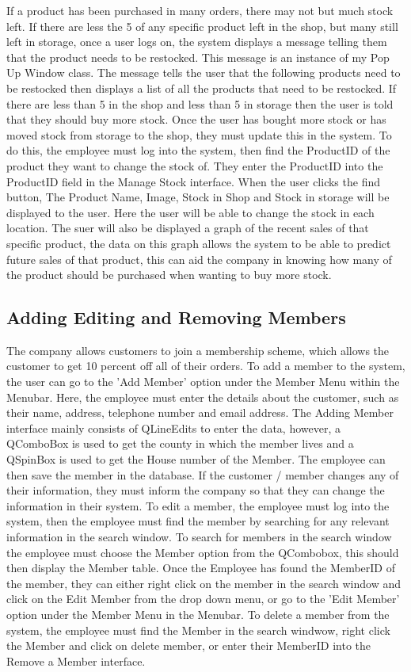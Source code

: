 If a product has been purchased in many orders, there may not but much stock left. If there are less the 5 of any specific product left in the shop, but many still left in storage, once a user logs on, the system displays a message telling them that the product needs to be restocked. This message is an instance of my Pop Up Window class. The message tells the user that the following products need to be restocked then displays a list of all the products that need to be restocked. If there are less than 5 in the shop and less than 5 in storage then the user is told that they should buy more stock. Once the user has bought more stock or has moved stock from storage to the shop, they must update this in the system. To do this, the employee must log into the system, then find the ProductID of the product they want to change the stock of. They enter the ProductID into the ProductID field in the Manage Stock interface. When the user clicks the find button, The Product Name, Image, Stock in Shop and Stock in storage will be displayed to the user. Here the user will be able to change the stock in each location. The suer will also be displayed a graph of the recent sales of that specific product, the data on this graph allows the system to be able to predict future sales of that product, this can aid the company in knowing how many of the product should be purchased when wanting to buy more stock.

\subsection{Adding Editing and Removing Members}
The company allows customers to join a membership scheme, which allows the customer to get 10 percent off all of their orders. To add a member to the system, the user can go to the 'Add Member' option under the Member Menu within the Menubar. Here, the employee must enter the details about the customer, such as their name, address, telephone number and email address. The Adding Member interface mainly consists of QLineEdits to enter the data, however, a QComboBox is used to get the county in which the member lives and a QSpinBox is used to get the House number of the Member. The employee can then save the member in the database. If the customer / member changes any of their information, they must inform the company so that they can change the information in their system. To edit a member, the employee must log into the system, then the employee must find the member by searching for any relevant information in the search window. To search for members in the search window the employee must choose the Member option from the QCombobox, this should then display the Member table. Once the Employee has found the MemberID of the member, they can either right click on the member in the search window and click on the Edit Member from the drop down menu, or go to the 'Edit Member' option under the Member Menu in the Menubar. To delete a member from the system, the employee must find the Member in the search windwow, right click the Member and click on delete member, or enter their MemberID into the Remove a Member interface.

